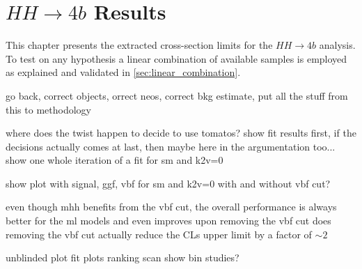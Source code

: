 \chapter{$HH\rightarrow 4b$ Results}\label{ch:hh4b-results}

This chapter presents the extracted cross-section limits for the $HH\rightarrow 4b$ analysis. To test on any \ktwov hypothesis a linear combination of available samples is employed as explained and validated in \ref{sec:linear_combination}.
\begin{landscape}
    \begin{figure}
        \centering
        \caption[]{}
        \label{fig:k2v_scan_limits_overlay}
    \end{figure}
\end{landscape}


go back, correct objects,  orrect neos, correct bkg estimate, put all the stuff from this to methodology



where does the twist happen to decide to use tomatos? show fit results first, if the decisions actually comes at last, then maybe here in the argumentation too...
show one whole iteration of a fit for sm and k2v=0

show plot with signal, ggf, vbf for sm and k2v=0 with and without vbf cut?

even though mhh benefits from the vbf cut, the overall performance is always better for the \ac{ml} models and even improves upon removing the vbf cut
does removing the vbf cut actually reduce the CLs upper limit by a factor of $\sim 2$

unblinded plot
fit plots
ranking
scan
show bin studies?


